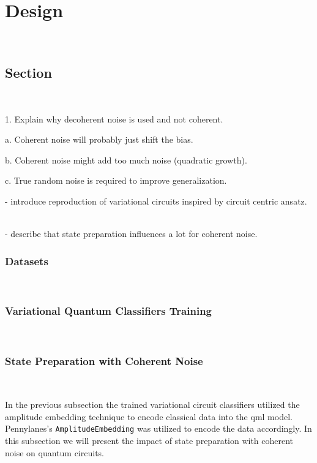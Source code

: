 \chapter{Design}\label{chapter:design} \

\section{Section} \

1.	Explain why decoherent noise is used and not coherent. \

  a. Coherent noise will probably just shift the bias. \

  b. Coherent noise might add too much noise (quadratic growth). \

  c. True random noise is required to improve generalization. \


- introduce reproduction of variational circuits inspired by circuit centric ansatz. \

- describe that state preparation influences a lot for coherent noise. \

\subsection{Datasets}\label{subsection:datasets} \


\subsection{Variational Quantum Classifiers Training}\label{subsection:vqc_training} \


\subsection{State Preparation with Coherent Noise}\label{subsection:state_preparation_noise} \

In the previous subsection the trained variational circuit classifiers
utilized the amplitude embedding technique to encode classical data
into the \ac{qml} model. Pennylanes's \colorbox{inline_gray}{\lstinline|AmplitudeEmbedding|}
was utilized to encode the data accordingly. In this subsection we will
present the impact of state preparation with coherent noise on quantum
circuits. \

